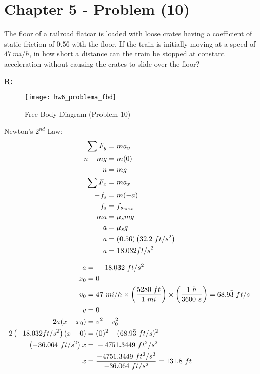 \section{Chapter 5 - Problem (10)}

	The floor of a railroad flatcar is loaded with loose crates having a coefficient of static friction of $0.56$ with the floor. If the train is initially moving at a speed of $47 \ mi/h$, in how short a distance can the train be stopped at constant acceleration without causing the crates to slide over the floor?

	\textbf{R:} \newline

	\begin{figure}[H]
		\begin{center}
			\texttt{[image: hw6\_problema\_fbd]}
			\caption{Free-Body Diagram (Problem 10)}
			\label{fig:hw6_problema_fbd}
		\end{center}
	\end{figure}

	Newton's $2^{nd}$ Law:
	\begin{align}
		\sum F_{y} = \ &ma_{y}& \notag \\
		n - mg = \ &m(0)& \notag \\
		n = \ &mg& \notag \\
		\sum F_{x} = \ &ma_{x}& \notag \\
		-f_{s} = \ &m(-a)& \notag \\
		f_{s} = \ &f_{s_{max}}& \notag \\
		ma = \ &\mu_{s}mg& \notag \\
		a = \ &\mu_{s}g& \notag \\
		a = \ &(0.56) \left( 32.2 \ ft/s^{2} \right)& \notag \\
		a = \ &18.032 ft/s^{2}& \notag
	\end{align}

	\begin{align}
		a = \ &-18.032 \ ft/s^{2}& \notag \\
		x_{0} = \ &0& \notag \\
		v_{0} = \ &47 \ mi/h
		\times \left( \frac{5280 \ ft}{1 \ mi} \right)
		\times \left( \frac{1 \ h}{3600 \ s} \right) = 68.9\bar{3} \ ft/s& \notag \\
		v = \ &0& \notag \\
		2a(x-x_{0}) = \ &v^{2} - v_{0}^{2}& \notag \\
		2\left( -18.032 ft/s^{2} \right)(x-0) = \ &(0)^{2} - (68.9\bar{3} \ ft/s)^{2}& \notag \\
		\left( -36.064 \ ft/s^{2} \right)x = \ &-4751.3449 \ ft^{2}/s^{2}& \notag \\
		x = \ &\frac{-4751.3449 \ ft^{2}/s^{2}}{-36.064 \ ft/s^{2}} = 131.8 \ ft&
	\end{align}
